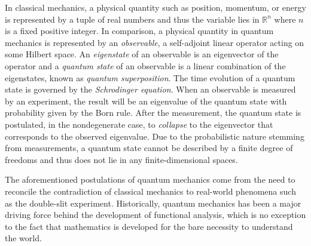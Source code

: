 

\begin{exm}
  \label{exm:quantumMechanics}  
  In classical mechanics, a physical quantity
  such as position, momentum, or energy
  is represented by a tuple of real numbers
  and thus the variable lies in $\mathbb{R}^n$
  where $n$ is a fixed positive integer.
  In comparison,
  a physical quantity in quantum mechanics 
  is represented by an \emph{observable},
  a self-adjoint linear operator acting on some Hilbert space.
  An \emph{eigenstate} of an observable
  is an eigenvector of the operator
  and a \emph{quantum state} of an observable
  is a linear combination of the eigenstates,
  known as \emph{quantum superposition}.
  The time evolution of a quantum state
  is governed by the \emph{Schrodinger equation}. 
  When an observable is measured by an experiment, 
  the result will be an eigenvalue of the quantum state
  with probability given by the Born rule.
  After the measurement,
  the quantum state is postulated, in the nondegenerate case,
  to \emph{collapse} to the eigenvector that corresponds
  to the observed eigenvalue.
  Due to the probabilistic nature stemming from measurements,
   a quantum state cannot be described by
   a finite degree of freedoms
   and thus does not lie in any finite-dimensional spaces.

  The aforementioned postulations of quantum mechanics
   come from the need to reconcile
   the contradiction of classical mechanics
   to real-world phenomena
   such as the double-slit experiment. 
  Historically, quantum mechanics has been a major driving force
   behind the development of functional analysis, 
   which is no exception to the fact
   that mathematics is developed
   for the bare necessity to understand the world.
\end{exm}

